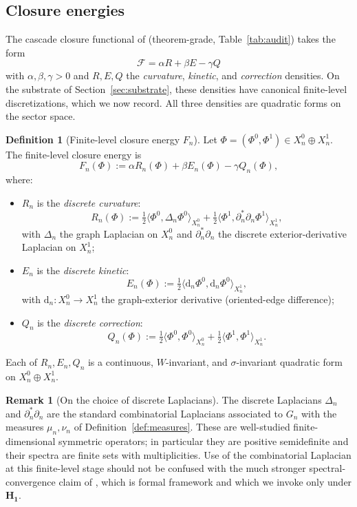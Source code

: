 \documentclass[11pt, a4paper]{amsart}
\theoremstyle{definition}
\newtheorem{definition}[theorem]{Definition}
\newtheorem{remark}[theorem]{Remark}
\begin{document}
\subsection{Closure energies}
\label{subsec:closure-energies}

The cascade closure functional of \cite[\S F2]{CascadeFoundations}
(theorem-grade, Table~\ref{tab:audit}) takes the form
\[
  \mathcal{F} = \alpha R + \beta E - \gamma Q
\]
with $\alpha, \beta, \gamma > 0$ and $R, E, Q$ the
\emph{curvature}, \emph{kinetic}, and \emph{correction} densities.
On the substrate of Section~\ref{sec:substrate}, these densities
have canonical finite-level discretizations, which we now record.
All three densities are quadratic forms on the sector space.

\begin{definition}[Finite-level closure energy $F_n$]
\label{def:Fn}
Let $\Phi = (\Phi^0, \Phi^1) \in X_n^0 \oplus X_n^1$. The
finite-level closure energy is
\begin{equation}
\label{eq:Fn}
  F_n(\Phi) := \alpha R_n(\Phi) + \beta E_n(\Phi) - \gamma Q_n(\Phi),
\end{equation}
where:
\begin{itemize}
\item $R_n$ is the \emph{discrete curvature}:
\[
  R_n(\Phi) := \tfrac{1}{2}
    \big\langle \Phi^0, \Delta_n \Phi^0 \big\rangle_{X_n^0}
    + \tfrac{1}{2}
    \big\langle \Phi^1, \partial_n^* \partial_n \Phi^1 \big\rangle_{X_n^1},
\]
with $\Delta_n$ the graph Laplacian on $X_n^0$ and
$\partial_n^* \partial_n$ the discrete exterior-derivative Laplacian
on $X_n^1$;
\item $E_n$ is the \emph{discrete kinetic}:
\[
  E_n(\Phi) := \tfrac{1}{2}
    \big\langle \mathrm{d}_n \Phi^0, \mathrm{d}_n \Phi^0 \big\rangle_{X_n^1},
\]
with $\mathrm{d}_n \colon X_n^0 \to X_n^1$ the graph-exterior
derivative (oriented-edge difference);
\item $Q_n$ is the \emph{discrete correction}:
\[
  Q_n(\Phi) := \tfrac{1}{2}
    \big\langle \Phi^0, \Phi^0 \big\rangle_{X_n^0}
    + \tfrac{1}{2}
    \big\langle \Phi^1, \Phi^1 \big\rangle_{X_n^1}.
\]
\end{itemize}
Each of $R_n, E_n, Q_n$ is a continuous, $W$-invariant, and
$\sigma$-invariant quadratic form on $X_n^0 \oplus X_n^1$.
\end{definition}

\begin{remark}[On the choice of discrete Laplacians]
The discrete Laplacians $\Delta_n$ and $\partial_n^* \partial_n$
are the standard combinatorial Laplacians associated to
$G_n$ with the measures $\mu_n, \nu_n$ of
Definition~\ref{def:measures}. These are well-studied
finite-dimensional symmetric operators; in particular they are
positive semidefinite and their spectra are finite sets with
multiplicities. Use of the combinatorial Laplacian at this
finite-level stage should not be confused with the much stronger
spectral-convergence claim of
\cite[\S C2.bis.1]{CascadeGR}, which is formal framework and which
we invoke only under $\mathbf{H_1}$.
\end{remark}
\end{document}
